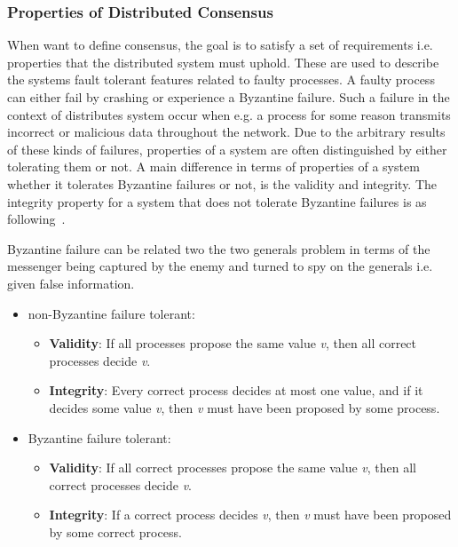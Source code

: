 \subsubsection{Properties of Distributed Consensus} %
\label{ssub:properties_of_distributed_consensus}

When want to define consensus, the goal is to satisfy a set of requirements i.e. properties that the distributed system must uphold. These are used to describe the systems fault tolerant features related to faulty processes. A faulty process can either fail by crashing or experience a Byzantine failure. Such a failure in the context of distributes system occur when e.g. a process for some reason transmits incorrect or malicious data throughout the network. Due to the arbitrary results of these kinds of failures, properties of a system are often distinguished by either tolerating them or not. A main difference in terms of properties of a system whether it tolerates Byzantine failures or not, is the validity and integrity. The integrity property for a system that does not tolerate Byzantine failures is as following~\cite{DistributedSystems}.

Byzantine failure can be related two the two generals problem in terms of the messenger being captured by the enemy and turned to spy on the generals i.e. given false information.

\begin{itemize}
\item non-Byzantine failure tolerant:
	\begin{itemize}
	\item \textbf{Validity}: If all processes propose the same value \textit{v}, then all correct processes decide \textit{v}.
	\item \textbf{Integrity}: Every correct process decides at most one value, and if it decides some value \textit{v}, then \textit{v} must have been proposed by some process.
	\end{itemize}
\item Byzantine failure tolerant:
	\begin{itemize}
	\item \textbf{Validity}: If all correct processes propose the same value \textit{v}, then all correct processes decide \textit{v}.
	\item \textbf{Integrity}: If a correct process decides \textit{v}, then \textit{v} must have been proposed by some correct process.
	\end{itemize}
\end{itemize}

